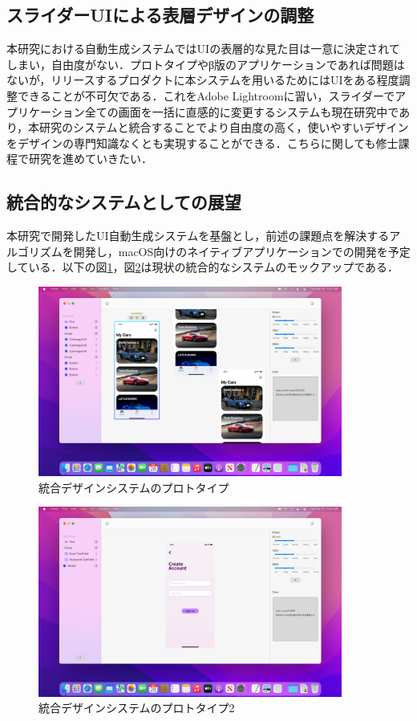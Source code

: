 \subsection{スライダーUIによる表層デザインの調整}
本研究における自動生成システムではUIの表層的な見た目は一意に決定されてしまい，自由度がない．プロトタイプやβ版のアプリケーションであれば問題はないが，リリースするプロダクトに本システムを用いるためにはUIをある程度調整できることが不可欠である．これをAdobe Lightroomに習い，スライダーでアプリケーション全ての画面を一括に直感的に変更するシステムも現在研究中であり，本研究のシステムと統合することでより自由度の高く，使いやすいデザインをデザインの専門知識なくとも実現することができる．こちらに関しても修士課程で研究を進めていきたい．

\subsection{統合的なシステムとしての展望}
本研究で開発したUI自動生成システムを基盤とし，前述の課題点を解決するアルゴリズムを開発し，macOS向けのネイティブアプリケーションでの開発を予定している．以下の図\ref{fig:autogen-integrated}，図\ref{fig:autogen-integrated2}は現状の統合的なシステムのモックアップである．

\begin{figure}[htbp]
  \begin{minipage}{\hsize}
    \begin{center}
       \includegraphics[width=100mm]{img/autogen-integrated.png}
    \end{center}
    \caption{統合デザインシステムのプロトタイプ}
    \label{fig:autogen-integrated}
  \end{minipage}
\end{figure}


\begin{figure}[htbp]
  \begin{minipage}{\hsize}
    \begin{center}
       \includegraphics[width=100mm]{img/autogen-integrated2.png}
    \end{center}
    \caption{統合デザインシステムのプロトタイプ2}
    \label{fig:autogen-integrated2}
  \end{minipage}
\end{figure}
